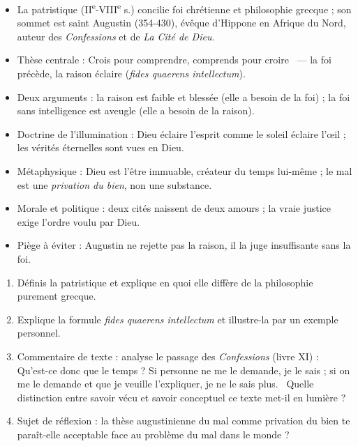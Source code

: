 \documentclass[11pt]{article}
\newcommand{\cle}[1]{{\popxbold\color{popdark}#1}}
\begin{document}
\begin{aretenir}
\begin{itemize}
\item La \cle{patristique} (II\textsuperscript{e}-VIII\textsuperscript{e} s.) concilie foi chrétienne et philosophie grecque ; son sommet est saint Augustin (354-430), évêque d'Hippone en Afrique du Nord, auteur des \emph{Confessions} et de \emph{La Cité de Dieu}.
\item Thèse centrale : \guillemotleft Crois pour comprendre, comprends pour croire \guillemotright\ — la foi précède, la raison éclaire (\emph{fides quaerens intellectum}).
\item Deux arguments : la raison est faible et blessée (elle a besoin de la foi) ; la foi sans intelligence est aveugle (elle a besoin de la raison).
\item Doctrine de l'\cle{illumination} : Dieu éclaire l'esprit comme le soleil éclaire l'œil ; les vérités éternelles sont vues en Dieu.
\item Métaphysique : Dieu est l'être immuable, créateur du temps lui-même ; le mal est une \emph{privation du bien}, non une substance.
\item Morale et politique : deux cités naissent de deux amours ; la vraie justice exige l'ordre voulu par Dieu.
\item Piège à éviter : Augustin ne rejette pas la raison, il la juge insuffisante sans la foi.
\end{itemize}
\end{aretenir}

\begin{exercice}
\begin{enumerate}
\item Définis la patristique et explique en quoi elle diffère de la philosophie purement grecque.
\item Explique la formule \emph{fides quaerens intellectum} et illustre-la par un exemple personnel.
\item Commentaire de texte : analyse le passage des \emph{Confessions} (livre XI) : \guillemotleft Qu'est-ce donc que le temps ? Si personne ne me le demande, je le sais ; si on me le demande et que je veuille l'expliquer, je ne le sais plus. \guillemotright\ Quelle distinction entre savoir vécu et savoir conceptuel ce texte met-il en lumière ?
\item Sujet de réflexion : la thèse augustinienne du mal comme privation du bien te paraît-elle acceptable face au problème du mal dans le monde ?
\end{enumerate}
\end{exercice}
\end{document}
